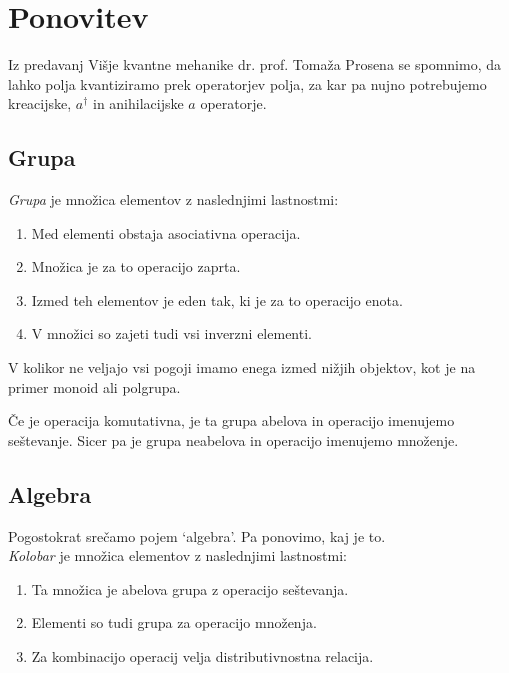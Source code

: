 \section{Ponovitev}

Iz predavanj Višje kvantne mehanike dr. prof. Tomaža Prosena se spomnimo, da lahko polja
kvantiziramo prek operatorjev polja, za kar pa nujno potrebujemo kreacijske, $a^\dagger$ in 
anihilacijske $a$ operatorje.

\subsection{Grupa}

\vspace{0.5 cm}

{\em Grupa} je množica elementov z naslednjimi lastnostmi:

\begin{enumerate}
	\item{Med elementi obstaja asociativna operacija.}
	\item{Množica je za to operacijo zaprta.}
	\item{Izmed teh elementov je eden tak, ki je za to operacijo enota.}
	\item{V množici so zajeti tudi vsi inverzni elementi.}
\end{enumerate}

V kolikor ne veljajo vsi pogoji imamo enega izmed nižjih objektov, kot je na primer monoid
ali polgrupa.

Če je operacija komutativna, je ta grupa abelova in operacijo imenujemo seštevanje. Sicer
pa je grupa neabelova in operacijo imenujemo množenje.

\subsection{Algebra}

\vspace{0.5cm}

Pogostokrat srečamo pojem `algebra'. Pa ponovimo, kaj je to.\\

\emph{Kolobar} je množica elementov z naslednjimi lastnostmi:

\begin{enumerate}
	\item{Ta množica je abelova grupa z operacijo seštevanja.}
	\item{Elementi so tudi grupa za operacijo množenja.}
	\item{Za kombinacijo operacij velja distributivnostna relacija.}
\end{enumerate}

